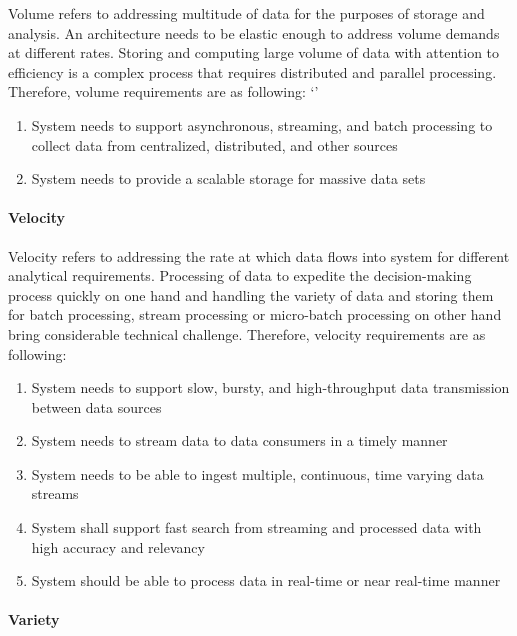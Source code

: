 \documentclass{bmcart}
\begin{document}
Volume refers to addressing multitude of data for the purposes of storage and analysis. An architecture needs to be elastic enough to address volume demands at different rates. Storing and computing large volume of data with attention to efficiency is a complex process that requires distributed and parallel processing. Therefore, volume requirements are as following:
`'

\begin{enumerate}[label=\textbf{Vol-\arabic*}]
    \item System needs to support asynchronous, streaming, and batch processing to collect data from centralized, distributed, and other sources
    \item System needs to provide a scalable storage for massive data sets
\end{enumerate}


\paragraph{Velocity}

Velocity refers to addressing the rate at which data flows into system for different analytical requirements. Processing of data to expedite the decision-making process quickly on one hand and handling the variety of data and storing them for batch processing, stream processing or micro-batch processing on other hand bring considerable technical challenge. Therefore, velocity requirements are as following: 

\begin{enumerate}[label=\textbf{Vel-\arabic*}]
    \item System needs to support slow, bursty, and high-throughput data transmission between data sources
    \item System needs to stream data to data consumers in a timely manner
    \item System needs to be able to ingest multiple, continuous, time varying data streams
    \item System shall support fast search from streaming and processed data with high accuracy and relevancy
    \item System should be able to process data in real-time or near real-time manner
\end{enumerate}


\paragraph{Variety}
\end{document}
